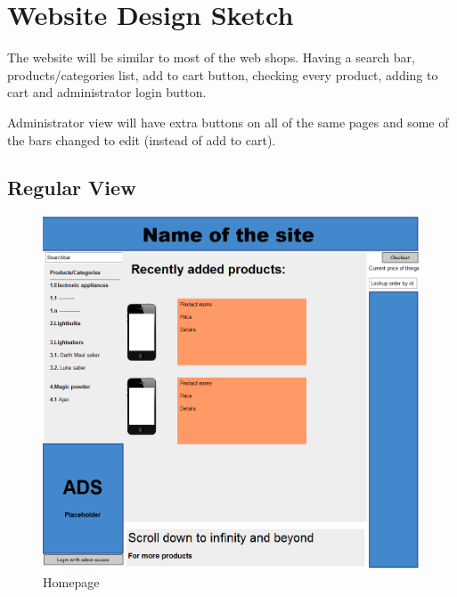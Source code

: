 \documentclass[a4paper,12pt]{article}
\begin{document}
\section{Website Design Sketch}
The website will be similar to most of the web shops. Having a search bar, products/categories list, add to cart button, checking every product, adding to cart and administrator login button.

Administrator view will have extra buttons on all of the same pages and some of the bars changed to edit (instead of add to cart).

\subsection{Regular View}
\begin{figure}[htbp]
	\caption{Homepage}
	\includegraphics[width=\textwidth,height=\textheight,keepaspectratio]{img/Homepage.png}
\end{figure}
\end{document}
